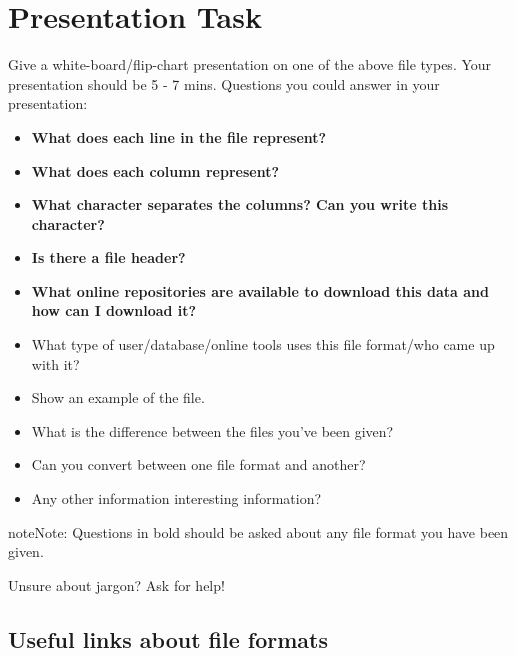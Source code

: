 \documentclass[letterpaper,10pt,english]{sphinxmanual}
\begin{document}
\section{Presentation Task}
\label{known_file_formats:presentation-task}
Give a white-board/flip-chart presentation on one of the above file types. Your presentation should be 5 - 7 mins.
Questions you could answer in your presentation:
\begin{itemize}
\item {} 
\textbf{What does each line in the file represent?}

\item {} 
\textbf{What does each column represent?}

\item {} 
\textbf{What character separates the columns? Can you write this character?}

\item {} 
\textbf{Is there a file header?}

\item {} 
\textbf{What online repositories are available to download this data and how can I download it?}

\item {} 
What type of user/database/online tools uses this file format/who came up with it?

\item {} 
Show an example of the file.

\item {} 
What is the difference between the files you’ve been given?

\item {} 
Can you convert between one file format and another?

\item {} 
Any other information interesting information?

\end{itemize}

\begin{notice}{note}{Note:}
Questions in bold should be asked about any file format you have been given.
\end{notice}

Unsure about jargon? Ask for help!


\subsection{Useful links about file formats}
\label{known_file_formats:useful-links-about-file-formats}
\end{document}
